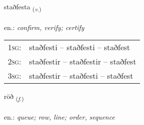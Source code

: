 \documentclass[frontgrid, backgrid]{flacards}\usepackage[]{graphicx}\usepackage[]{xcolor}
\begin{document}
\renewcommand{\flhead}{\vskip5pt \fboxsep=0pt {\small\bfseries\footnotesize Sagnorð | Verb}}
\renewcommand{\fcfoot}{\vskip5pt \fboxsep=0pt \hspace{2pt}{\small\bfseries\footnotesize 1K}}

\renewcommand{\blhead}{\vskip5pt {\small\bfseries\footnotesize Sagnorð | Verb }}
\renewcommand{\bcfoot}{\vskip5pt \hspace{2pt}{\small\bfseries\footnotesize 1K}}


{staðfesta \small{\textsubscript{(\textit{v.})}} \\[1ex] %
\textphonetic{[staðfɛsta]} \\
en.: \emph{confirm, verify; certify} \\  [2ex]
\renewcommand*{\arraystretch}{0.8}
\begin{tabular}{p{1cm}l}
\textsc{1sg}: & staðfesti -- staðfesti -- staðfest \\ 
\textsc{2sg}: & staðfestir -- staðfestir -- staðfest \\ 
\textsc{3sg}: & staðfestir -- staðfesti -- staðfest \\ 
\end{tabular}
}

\renewcommand{\flhead}{\vskip5pt \fboxsep=0pt {\small\bfseries\footnotesize Nafnorð | Noun}}
\renewcommand{\fcfoot}{\vskip5pt \fboxsep=0pt \hspace{2pt}{\small\bfseries\footnotesize 1K}}

\renewcommand{\blhead}{\vskip5pt {\small\bfseries\footnotesize Nafnorð | Noun }}
\renewcommand{\bcfoot}{\vskip5pt \hspace{2pt}{\small\bfseries\footnotesize 1K}}


{röð \small{\textsubscript{(\textit{f.})}} \\[1ex] %
\textphonetic{[rœːð]} \\
en.: \emph{queue; row, line; order, sequence} \\  [2ex]
\renewcommand*{\arraystretch}{0.8}
}
\end{document}
